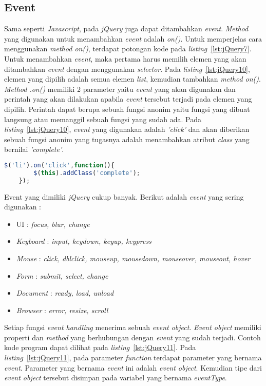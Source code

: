 \subsection{Event}
Sama seperti \textit{Javascript}, pada \textit{jQuery} juga dapat ditambahkan \textit{event}. \textit{Method} yang digunakan untuk menambahkan \textit{event} adalah \textit{on()}. Untuk memperjelas cara menggunakan \textit{method on()}, terdapat potongan kode pada \textit{listing}~\ref{lst:jQuery7}. Untuk menambahkan \textit{event}, maka pertama harus memilih elemen yang akan ditambahkan \textit{event} dengan menggunakan \textit{selector}. Pada \textit{listing}~\ref{lst:jQuery10}, elemen yang dipilih adalah semua elemen \textit{list}, kemudian tambahkan \textit{method on()}. \textit{Method .on()} memiliki 2 parameter yaitu \textit{event} yang akan digunakan dan perintah yang akan dilakukan apabila \textit{event} tersebut terjadi pada elemen yang dipilih. Perintah dapat berupa sebuah fungsi anonim yaitu fungsi yang dibuat langsung atau memanggil sebuah fungsi yang sudah ada. Pada \textit{listing}~\ref{lst:jQuery10}, \textit{event} yang digunakan adalah \textit{'click'} dan akan diberikan sebuah fungsi anonim yang tugasnya adalah menambahkan atribut \textit{class} yang bernilai \textit{'complete'}. 

\begin{lstlisting}[language=Javascript, caption=Menambahkan atribut \textit{class} pada setiap \textit{list} menggunakan event \textit{'click'}, label={lst:jQuery10}]
	$('li').on('click',function(){
		$(this).addClass('complete');
	});
\end{lstlisting}

Event yang dimiliki \textit{jQuery} cukup banyak. Berikut adalah \textit{event} yang sering digunakan :
\begin{itemize}
	\item UI : \textit{focus, blur, change}
	\item \textit{Keyboard} : \textit{input, keydown, keyup, keypress}
	\item \textit{Mouse} : \textit{click, dblclick, mouseup, mousedown, mouseover, mouseout, hover}
	\item \textit{Form} : \textit{submit, select, change}
	\item \textit{Document} : \textit{ready, load, unload}
	\item \textit{Browser} : \textit{error, resize, scroll}
\end{itemize}

Setiap fungsi \textit{event handling} menerima sebuah \textit{event object}. \textit{Event object} memiliki properti dan \textit{method} yang berhubungan dengan \textit{event} yang sudah terjadi. Contoh kode program dapat dilihat pada \textit{listing}~\ref{lst:jQuery11}. Pada \textit{listing}~\ref{lst:jQuery11}, pada parameter \textit{function} terdapat parameter yang bernama \textit{event}. Parameter yang bernama \textit{event} ini adalah \textit{event object}. Kemudian tipe dari \textit{event object} tersebut disimpan pada variabel yang bernama \textit{eventType}. 

